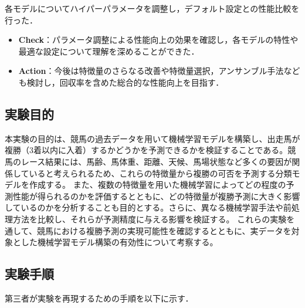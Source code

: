 \documentclass[dvipdfmx, a4paper, 11pt, titlepage]{jsarticle}
\begin{document}
各モデルについてハイパーパラメータを調整し，デフォルト設定との性能比較を行った．

\begin{itemize}
    \item \textbf{Check}：パラメータ調整による性能向上の効果を確認し，各モデルの特性や最適な設定について理解を深めることができた．
    \item \textbf{Action}：今後は特徴量のさらなる改善や特徴量選択，アンサンブル手法なども検討し，回収率を含めた総合的な性能向上を目指す．
\end{itemize}

\subsection{実験目的}
本実験の目的は、競馬の過去データを用いて機械学習モデルを構築し、出走馬が複勝（3着以内に入着）するかどうかを予測できるかを検証することである。競馬のレース結果には、馬齢、馬体重、距離、天候、馬場状態など多くの要因が関係していると考えられるため、これらの特徴量から複勝の可否を予測する分類モデルを作成する。
また、複数の特徴量を用いた機械学習によってどの程度の予測性能が得られるのかを評価するとともに、どの特徴量が複勝予測に大きく影響しているのかを分析することも目的とする。さらに、異なる機械学習手法や前処理方法を比較し、それらが予測精度に与える影響を検証する。
これらの実験を通して、競馬における複勝予測の実現可能性を確認するとともに、実データを対象とした機械学習モデル構築の有効性について考察する。

\subsection{実験手順}

第三者が実験を再現するための手順を以下に示す．
\end{document}
